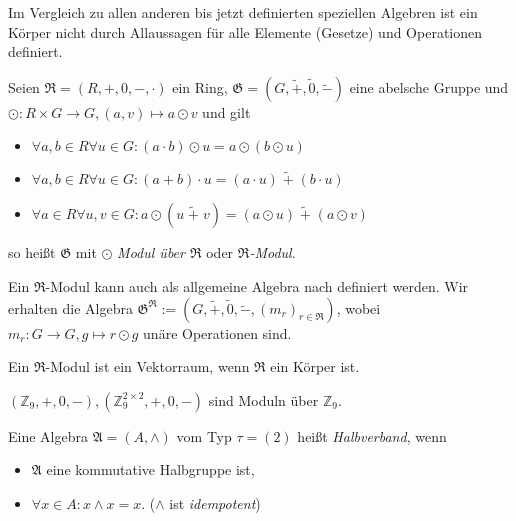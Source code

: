 \begin{remark}
    Im Vergleich zu allen anderen bis jetzt definierten speziellen Algebren ist ein Körper nicht durch Allaussagen für alle Elemente (Gesetze) und Operationen definiert. 
\end{remark}

\begin{definition}
    Seien $\mathfrak{R} = (R, +, 0, -, \cdot)$ ein Ring, $\mathfrak{G} = (G, \widetilde{+}, \widetilde{0}, \widetilde{-})$ eine abelsche Gruppe und $\odot: R \times G \to G, (a, v) \mapsto a \odot v$ und gilt
    \begin{itemize}[topsep=0pt, label={--}]
        \item $\forall a,b \in R \forall u \in G: (a \cdot b)\odot u = a \odot (b \odot u)$
        \item $\forall a,b \in R \forall u \in G: (a + b) \cdot u = (a \cdot u) \;\widetilde{+}\; (b \cdot u)$
        \item $\forall a \in R \forall u,v \in G: a \odot (u \;\widetilde{+}\; v) = (a \odot u) \;\widetilde{+}\; (a \odot v)$
    \end{itemize}
    so heißt $\mathfrak{G}$ mit $\odot$ \emph{Modul über $\mathfrak{R}$} oder \emph{$\mathfrak{R}$-Modul}.

    Ein $\mathfrak{R}$-Modul kann auch als allgemeine Algebra nach  definiert werden. Wir erhalten die Algebra $\mathfrak{G}^\mathfrak{R} := (G, \widetilde{+}, \widetilde{0}, \widetilde{-}, (m_r)_{r \in \mathfrak{R}})$, wobei $m_r: G \to G, g \mapsto r \odot g$ unäre Operationen sind.
\end{definition}

\begin{remark}
    Ein $\mathfrak{R}$-Modul ist ein Vektorraum, wenn $\mathfrak{R}$ ein Körper ist.
\end{remark}

\begin{example}
    $(\mathbb{Z}_9, +, 0, -), (\mathbb{Z}_9^{2 \times 2}, +, 0, -)$ sind Moduln über $\mathbb{Z}_9$.
\end{example}

\begin{definition}
    Eine Algebra $\mathfrak{A} = (A, \wedge)$ vom Typ $\tau = (2)$ heißt \emph{Halbverband}, wenn
    \begin{itemize}[topsep=0pt, label={--}]
        \item $\mathfrak{A}$ eine kommutative Halbgruppe ist,
        \item $\forall x \in A: x \wedge x = x$. \tab ($\wedge$ ist \emph{idempotent})
    \end{itemize}
\end{definition}

